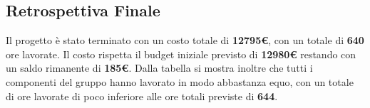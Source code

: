 \documentclass[a4paper,12pt]{article}
\begin{document}
                \subsection{Retrospettiva Finale}
                Il progetto è stato terminato con un costo totale di \textbf{12795€}, con un totale di \textbf{640} ore lavorate. Il costo rispetta il budget iniziale previsto di \textbf{12980€} restando con un saldo rimanente di \textbf{185€}.
                Dalla tabella si mostra inoltre che tutti i componenti del gruppo hanno lavorato in modo abbastanza equo, con un totale di ore lavorate di poco inferiore alle ore totali previste di \textbf{644}.
\end{document}
